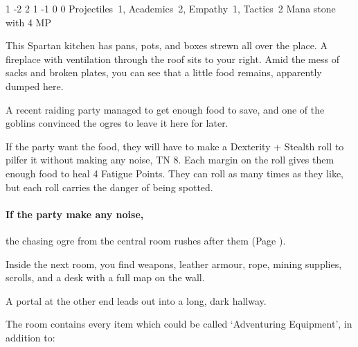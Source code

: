 \begin{multicols}{2}
{1}%
{-2}%
{{2}%
{1}%
{-1}}%
{0}%
{0}%
{Projectiles~1, Academics~2, Empathy~1, Tactics~2
}%
{Mana stone with 4 MP}%
{\addtocounter{sp}{8}}


\begin{boxtext}

	This Spartan kitchen has pans, pots, and boxes strewn all over the place.
	A fireplace with ventilation through the roof sits to your right.
	Amid the mess of sacks and broken plates, you can see that a little food remains, apparently dumped here.

\end{boxtext}

A recent raiding party managed to get enough food to save, and one of the goblins convinced the ogres to leave it here for later.

If the party want the food, they will have to make a Dexterity + Stealth roll to pilfer it without making any noise, TN 8.
Each margin on the roll gives them enough food to heal 4 Fatigue Points.
They can roll as many times as they like, but each roll carries the danger of being spotted.

\paragraph{If the party make any noise,}
the chasing ogre from the central room rushes after them (Page \pageref{chasingogre}).


\begin{boxtext}

	Inside the next room, you find weapons, leather armour, rope, mining supplies, scrolls, and a desk with a full map on the wall.

	A portal at the other end leads out into a long, dark hallway.

\end{boxtext}

The room contains every item which could be called `Adventuring Equipment',
\iftoggle{core}{%
\footnote{See the core book, page \pageref{start_equipment}.}
}{}%
in addition to:

\begin{itemize}


\end{itemize}
\end{multicols}
